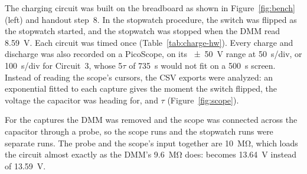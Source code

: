\documentclass[offwhitecover]{lennylab}
\newcommand{\ntau}[1]{#1\(\tau\)}   %
\begin{document}
The charging circuit was built on the breadboard as shown in Figure~\ref{fig:bench} (left) and handout step~8. In the stopwatch procedure, the switch was flipped as the stopwatch started, and the stopwatch was stopped when the DMM read \qty{8.59}{\volt}. Each circuit was timed once (Table~\ref{tab:charge-hw}). Every charge and discharge was also recorded on a PicoScope, on its \qty{\pm 50}{\volt} range at \qty{50}{\second}/div, or \qty{100}{\second}/div for Circuit~3, whose \ntau{5} of \qty{735}{\second} would not fit on a \qty{500}{\second} screen. Instead of reading the scope's cursors, the CSV exports were analyzed: an exponential fitted to each capture gives the moment the switch flipped, the voltage the capacitor was heading for, and $\tau$ (Figure~\ref{fig:scope}).

For the captures the DMM was removed and the scope was connected across the capacitor through a  probe, so the scope runs and the stopwatch runs were separate runs. The probe and the scope's input together are \qty{10}{\mega\ohm}, which loads the circuit almost exactly as the DMM's \qty{9.6}{\mega\ohm} does: \Vmax{} becomes \qty{13.64}{\volt} instead of \qty{13.59}{\volt}.
\end{document}
